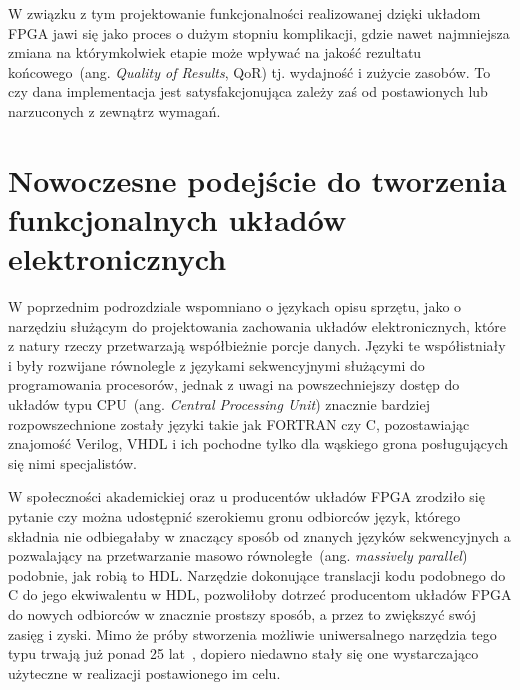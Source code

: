 W związku z tym projektowanie funkcjonalności realizowanej dzięki układom FPGA jawi się jako proces o dużym stopniu komplikacji, gdzie nawet najmniejsza zmiana na którymkolwiek etapie może wpływać na jakość rezultatu końcowego~(ang. \textit{Quality of Results}, QoR) tj. wydajność i zużycie zasobów. To czy dana implementacja jest satysfakcjonująca zależy zaś od postawionych lub narzuconych z zewnątrz wymagań. 

\section{Nowoczesne podejście do tworzenia funkcjonalnych układów elektronicznych}
W poprzednim podrozdziale wspomniano o językach opisu sprzętu, jako o narzędziu służącym do projektowania zachowania układów elektronicznych, które z natury rzeczy przetwarzają współbieżnie porcje danych. Języki te współistniały i były rozwijane równolegle z językami sekwencyjnymi służącymi do programowania procesorów, jednak z uwagi na powszechniejszy dostęp do układów typu CPU~(ang. \textit{Central Processing Unit}) znacznie bardziej rozpowszechnione zostały języki takie jak FORTRAN czy C, pozostawiając znajomość Verilog, VHDL i ich pochodne tylko dla wąskiego grona posługujących się nimi specjalistów.

W społeczności akademickiej oraz u producentów układów FPGA zrodziło się pytanie czy można udostępnić szerokiemu gronu odbiorców język, którego składnia nie odbiegałaby w znaczący sposób od znanych języków sekwencyjnych a pozwalający na przetwarzanie masowo równoległe~(ang. \textit{massively parallel}) podobnie, jak robią to HDL. Narzędzie dokonujące translacji kodu podobnego do C do jego ekwiwalentu w HDL, pozwoliłoby dotrzeć producentom układów FPGA do nowych odbiorców w znacznie prostszy sposób, a przez to zwiększyć swój zasięg i zyski. Mimo że próby stworzenia możliwie uniwersalnego narzędzia tego typu trwają już ponad 25 lat~\cite{C_VHDL}, dopiero niedawno stały się one wystarczająco użyteczne w realizacji postawionego im celu. 

